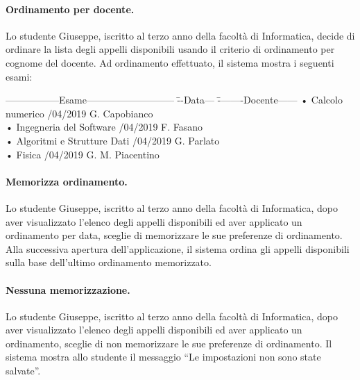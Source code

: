\paragraph{Ordinamento per docente.}
Lo studente Giuseppe, iscritto al terzo anno della facoltà di Informatica, decide di ordinare la lista degli appelli disponibili usando il criterio di ordinamento per cognome del docente. Ad ordinamento effettuato, il sistema mostra i seguenti esami:

\begin{tabbing}
	\hspace{1cm}-----------------Esame--------------------------- \= --Data--- \= --------Docente------ \kill
	\hspace{1cm} • Calcolo numerico /04/2019  \> G. Capobianco \\
	\hspace{1cm} • Ingegneria del Software /04/2019   \> F. Fasano \\
	\hspace{1cm} • Algoritmi e Strutture Dati /04/2019 \> G. Parlato \\	
	\hspace{1cm} • Fisica /04/2019 \> G. M. Piacentino  \\
\end{tabbing} 

\paragraph{Memorizza ordinamento.}
Lo studente Giuseppe, iscritto al terzo anno della facoltà di Informatica, dopo aver visualizzato l’elenco degli appelli disponibili ed aver applicato un ordinamento per data, sceglie di memorizzare le sue preferenze di ordinamento. Alla successiva apertura dell’applicazione, il sistema ordina gli appelli disponibili sulla base dell'ultimo ordinamento memorizzato.

\paragraph{Nessuna memorizzazione.}
Lo studente Giuseppe, iscritto al terzo anno della facoltà di Informatica, dopo aver visualizzato l’elenco degli appelli disponibili ed aver applicato un ordinamento, sceglie di non memorizzare le sue preferenze di ordinamento. Il sistema mostra allo studente il messaggio “Le impostazioni non sono state salvate”.

